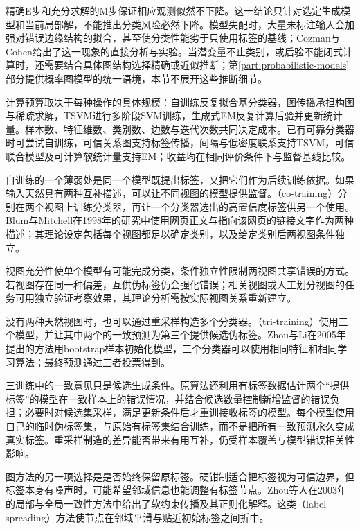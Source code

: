 精确E步和充分求解的M步保证相应观测似然不下降。这一结论只针对选定生成模型和当前局部解，不能推出分类风险必然下降。模型失配时，大量未标注输入会加强对错误边缘结构的拟合，甚至使分类性能劣于只使用标签的基线；Cozman与Cohen给出了这一现象的直接分析与实验。当潜变量不止类别，或后验不能闭式计算时，还需要结合具体图结构选择精确或近似推断；第\ref{part:probabilistic-models}部分提供概率图模型的统一语境，本节不展开这些推断细节。

计算预算取决于每种操作的具体规模：自训练反复拟合基分类器，图传播承担构图与稀疏求解，TSVM进行多阶段SVM训练，生成式EM反复计算后验并更新统计量。样本数、特征维数、类别数、边数与迭代次数共同决定成本。已有可靠分类器时可尝试自训练，可信关系图支持标签传播，间隔与低密度联系支持TSVM，可信联合模型及可计算软统计量支持EM；收益均在相同评价条件下与监督基线比较。

自训练的一个薄弱处是同一个模型既提出标签，又把它们作为后续训练依据。如果输入天然具有两种互补描述，可以让不同视图的模型提供监督。（co-training）分别在两个视图上训练分类器，再让一个分类器选出的高置信度标签供另一个使用。Blum与Mitchell在1998年的研究中使用网页正文与指向该网页的链接文字作为两种描述；其理论设定包括每个视图都足以确定类别，以及给定类别后两视图条件独立。

视图充分性使单个模型有可能完成分类，条件独立性限制两视图共享错误的方式。若视图存在同一种偏差，互供伪标签仍会强化错误；相关视图或人工划分视图的任务可用独立验证考察效果，其理论分析需按实际视图关系重新建立。

没有两种天然视图时，也可以通过重采样构造多个分类器。（tri-training）使用三个模型，并让其中两个的一致预测为第三个提供候选伪标签。Zhou与Li在2005年提出的方法用bootstrap样本初始化模型，三个分类器可以使用相同特征和相同学习算法；最终预测通过三者投票得到。

三训练中的一致意见只是候选生成条件。原算法还利用有标签数据估计两个“提供标签”的模型在一致样本上的错误情况，并结合候选数量控制新增监督的错误负担；必要时对候选集采样，满足更新条件后才重训接收标签的模型。每个模型使用自己的临时伪标签集，与原始有标签集结合训练，而不是把所有一致预测永久变成真实标签。重采样制造的差异能否带来有用互补，仍受样本覆盖与模型错误相关性影响。

图方法的另一项选择是是否始终保留原标签。硬钳制适合把标签视为可信边界，但标签本身有噪声时，可能希望邻域信息也能调整有标签节点。Zhou等人在2003年的局部与全局一致性方法中给出了软约束传播及其正则化解释。这类（label spreading）方法使节点在邻域平滑与贴近初始标签之间折中。


